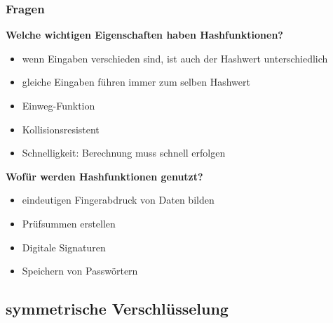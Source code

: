 \documentclass[12pt,a4paper]{article}
\begin{document}
\subsubsection{Fragen}
\textbf{Welche wichtigen Eigenschaften haben Hashfunktionen?}
\begin{itemize}
    \item wenn Eingaben verschieden sind, ist auch der Hashwert unterschiedlich
    \item gleiche Eingaben führen immer zum selben Hashwert
    \item Einweg-Funktion
    \item Kollisionsresistent
    \item Schnelligkeit: Berechnung muss schnell erfolgen
\end{itemize}
\textbf{Wofür werden Hashfunktionen genutzt?}
\begin{itemize}
    \item eindeutigen Fingerabdruck von Daten bilden
    \item Prüfsummen erstellen
    \item Digitale Signaturen
    \item Speichern von Passwörtern
\end{itemize}
\bigskip
\subsection{symmetrische Verschlüsselung}
\end{document}
